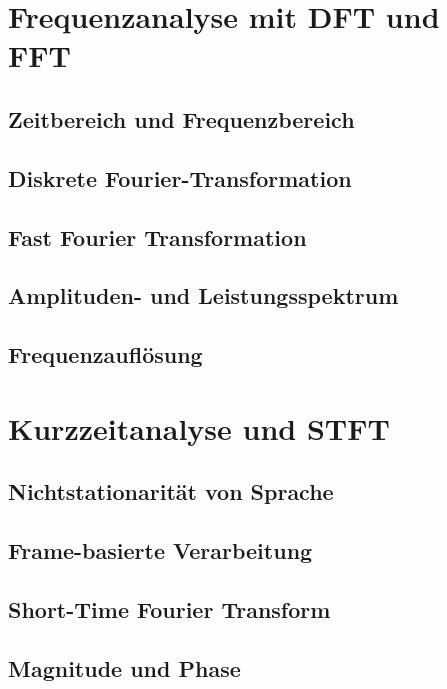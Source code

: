 \section{Frequenzanalyse mit DFT und FFT}

\subsection{Zeitbereich und Frequenzbereich}

\subsection{Diskrete Fourier-Transformation}

\subsection{Fast Fourier Transformation}

\subsection{Amplituden- und Leistungsspektrum}

\subsection{Frequenzauflösung}

\section{Kurzzeitanalyse und STFT}

\subsection{Nichtstationarität von Sprache}

\subsection{Frame-basierte Verarbeitung}

\subsection{Short-Time Fourier Transform}

\subsection{Magnitude und Phase}

